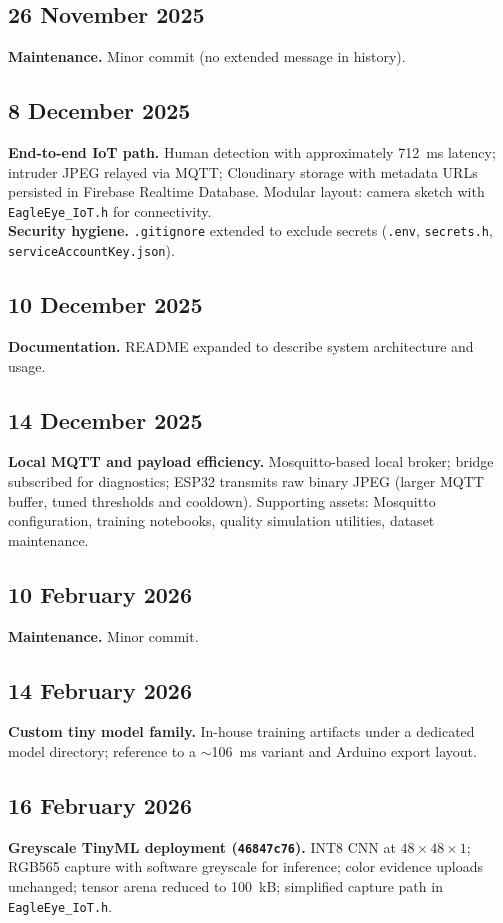 \documentclass[11pt,a4paper]{article}
\begin{document}
\subsection{26 November 2025}
\textbf{Maintenance.} Minor commit (no extended message in history).

\subsection{8 December 2025}
\textbf{End-to-end IoT path.} Human detection with approximately 712~ms latency; intruder JPEG relayed via MQTT; Cloudinary storage with metadata URLs persisted in Firebase Realtime Database. Modular layout: camera sketch with \texttt{EagleEye\_IoT.h} for connectivity. \\
\textbf{Security hygiene.} \texttt{.gitignore} extended to exclude secrets (\texttt{.env}, \texttt{secrets.h}, \texttt{serviceAccountKey.json}).

\subsection{10 December 2025}
\textbf{Documentation.} README expanded to describe system architecture and usage.

\subsection{14 December 2025}
\textbf{Local MQTT and payload efficiency.} Mosquitto-based local broker; bridge subscribed for diagnostics; ESP32 transmits raw binary JPEG (larger MQTT buffer, tuned thresholds and cooldown). Supporting assets: Mosquitto configuration, training notebooks, quality simulation utilities, dataset maintenance.

\subsection{10 February 2026}
\textbf{Maintenance.} Minor commit.

\subsection{14 February 2026}
\textbf{Custom tiny model family.} In-house training artifacts under a dedicated model directory; reference to a $\sim$106~ms variant and Arduino export layout.

\subsection{16 February 2026}
\textbf{Greyscale TinyML deployment (\texttt{46847c76}).} INT8 CNN at $48{\times}48{\times}1$; RGB565 capture with software greyscale for inference; color evidence uploads unchanged; tensor arena reduced to 100~kB; simplified capture path in \texttt{EagleEye\_IoT.h}.
\end{document}
